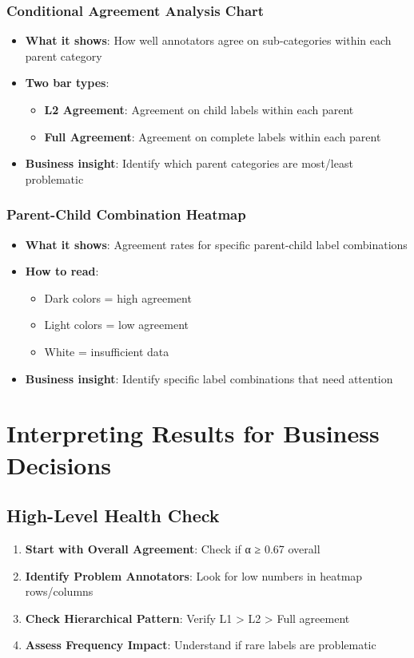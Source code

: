 \documentclass[11pt]{article}
\begin{document}
\subsubsection{Conditional Agreement Analysis Chart}
\begin{itemize}
\item \textbf{What it shows}: How well annotators agree on sub-categories within each parent category
\item \textbf{Two bar types}:
\begin{itemize}
\item \textbf{L2 Agreement}: Agreement on child labels within each parent
\item \textbf{Full Agreement}: Agreement on complete labels within each parent
\end{itemize}
\item \textbf{Business insight}: Identify which parent categories are most/least problematic
\end{itemize}

\subsubsection{Parent-Child Combination Heatmap}
\begin{itemize}
\item \textbf{What it shows}: Agreement rates for specific parent-child label combinations
\item \textbf{How to read}: 
\begin{itemize}
\item Dark colors = high agreement
\item Light colors = low agreement
\item White = insufficient data
\end{itemize}
\item \textbf{Business insight}: Identify specific label combinations that need attention
\end{itemize}

\section{Interpreting Results for Business Decisions}

\subsection{High-Level Health Check}
\begin{enumerate}
\item \textbf{Start with Overall Agreement}: Check if α ≥ 0.67 overall
\item \textbf{Identify Problem Annotators}: Look for low numbers in heatmap rows/columns
\item \textbf{Check Hierarchical Pattern}: Verify L1 > L2 > Full agreement
\item \textbf{Assess Frequency Impact}: Understand if rare labels are problematic
\end{enumerate}
\end{document}
